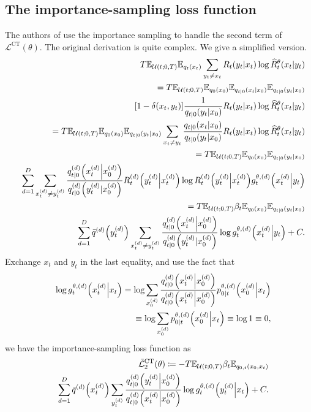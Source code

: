 \documentclass{article}
\begin{document}
\subsection{The importance-sampling loss function}
The authors of \cite{zhao2024unified} use the importance sampling to handle the second term of $\mathcal{L}^\text{CT}(\theta)$. The original derivation is quite complex. We give a simplified version.
\begin{eqnarray*}
  &&T\mathbb{E}_{\mathcal{U}(t;0,T)}\mathbb{E}_{q_t\qty(x_t)}\sum_{y_t\neq x_t}R_t\qty(y_t\middle|x_t)\log\widehat{R}_t^\theta\qty(x_t|y_t)\\
  &&=T\mathbb{E}_{\mathcal{U}(t;0,T)}\mathbb{E}_{q_0\qty(x_0)}\mathbb{E}_{q_{t|0}\qty(x_t|x_0)}\mathbb{E}_{q_{t|0}\qty(y_t|x_0)}\\
  &&\qty[1-\delta\qty(x_t, y_t)]\frac{1}{q_{t|0}\qty(y_t|x_0)}R_t\qty(y_t\middle|x_t)\log\widehat{R}_t^\theta\qty(x_t|y_t)\\
  &&=T\mathbb{E}_{\mathcal{U}(t;0,T)}\mathbb{E}_{q_0\qty(x_0)}\mathbb{E}_{q_{t|0}\qty(y_t|x_0)}\sum_{x_t\neq y_t}\frac{q_{t|0}\qty(x_t|x_0)}{q_{t|0}\qty(y_t|x_0)}R_t\qty(y_t\middle|x_t)\log\widehat{R}_t^\theta\qty(x_t|y_t)\\
  &&=T\mathbb{E}_{\mathcal{U}(t;0,T)}\mathbb{E}_{q_0\qty(x_0)}\mathbb{E}_{q_{t|0}\qty(y_t|x_0)}\\
  &&\sum_{d=1}^D\sum_{x^{(d)}_t\neq y^{(d)}_t}\frac{q^{(d)}_{t|0}\qty(x^{(d)}_t\middle|x^{(d)}_0)}{q^{(d)}_{t|0}\qty(y^{(d)}_t|x^{(d)}_0)}R^{(d)}_t\qty(y^{(d)}_t\middle|x^{(d)}_t)\log R^{(d)}_t\qty(y^{(d)}_t\middle|x^{(d)}_t)g^{\theta,(d)}_t\qty(x^{(d)}_t\middle|y_t)\\
  &&=T\mathbb{E}_{\mathcal{U}(t;0,T)}\beta_t\mathbb{E}_{q_0\qty(x_0)}\mathbb{E}_{q_{t|0}\qty(y_t|x_0)}\\
  &&\sum_{d=1}^D\bar{q}^{(d)}\qty(y^{(d)}_t)\sum_{x^{(d)}_t\neq y^{(d)}_t}\frac{q^{(d)}_{t|0}\qty(x^{(d)}_t\middle|x^{(d)}_0)}{q^{(d)}_{t|0}\qty(y^{(d)}_t|x^{(d)}_0)}\log g^{\theta,(d)}_t\qty(x^{(d)}_t\middle|y_t) + C.
\end{eqnarray*}
Exchange $x_t$ and $y_t$ in the last equality, and use the fact that
\begin{eqnarray}\label{eq:GthetaVanish}
  &&\log g^{\theta,(d)}_t\qty(x^{(d)}_t\middle|x_t)=\log \sum_{x^{(d)}_0}\frac{q^{(d)}_{t|0}\qty(x^{(d)}_t\middle|x^{(d)}_0)}{q^{(d)}_{t|0}\qty(x^{(d)}_t\middle|x^{(d)}_0)}p^{\theta,(d)}_{0|t}\qty(x^{(d)}_0\middle| x_t)\nonumber\\
  &&\equiv \log \sum_{x^{(d)}_0}p^{\theta,(d)}_{0|t}\qty(x^{(d)}_0\middle| x_t) \equiv \log 1 \equiv 0,
\end{eqnarray}
we have the importance-sampling loss function as
\begin{eqnarray}\label{eq:ELBOunified}
  &&\bar{\mathcal{L}}_2^\text{CT}(\theta)\coloneqq -T\mathbb{E}_{\mathcal{U}(t;0,T)}\beta_t\mathbb{E}_{q_{0,t}\qty(x_0,x_t)}\nonumber\\
  &&\sum_{d=1}^D\bar{q}^{(d)}\qty(x^{(d)}_t)\sum_{y^{(d)}_t}\frac{q^{(d)}_{t|0}\qty(y^{(d)}_t\middle|x^{(d)}_0)}{q^{(d)}_{t|0}\qty(x^{(d)}_t\middle|x^{(d)}_0)}\log g^{\theta,(d)}_t\qty(y^{(d)}_t\middle|x_t) + C.
\end{eqnarray}
\end{document}
